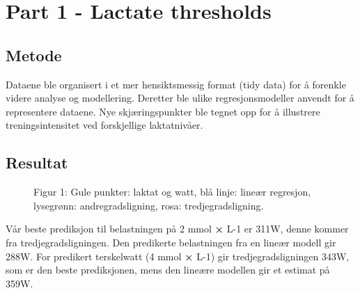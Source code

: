 \documentclass[
  letterpaper,
  DIV=11,
  numbers=noendperiod]{scrreprt}
\begin{document}
\section{Part 1 - Lactate thresholds}\label{part-1---lactate-thresholds}

\subsection{Metode}\label{metode-1}

Dataene ble organisert i et mer hensiktsmessig format (tidy data) for å
forenkle videre analyse og modellering. Deretter ble ulike
regresjonsmodeller anvendt for å representere dataene. Nye
skjæringspunkter ble tegnet opp for å illustrere treningsintensitet ved
forskjellige laktatnivåer.

\subsection{Resultat}\label{resultat-1}

\begin{figure}[H]


\caption{\label{fig-fig1}Figur 1: Gule punkter: laktat og watt, blå
linje: lineær regresjon, lysegrønn: andregradsligning, rosa:
tredjegradsligning.}

\end{figure}%

Vår beste prediksjon til belastningen på 2 mmol \textbf{×} L-1 er 311W,
denne kommer fra tredjegradsligningen. Den predikerte belastningen fra
en lineær modell gir 288W. For predikert terskelwatt (4 mmol \textbf{×}
L-1) gir tredjegradsligningen 343W, som er den beste prediksjonen, mens
den lineære modellen gir et estimat på 359W.
\end{document}
